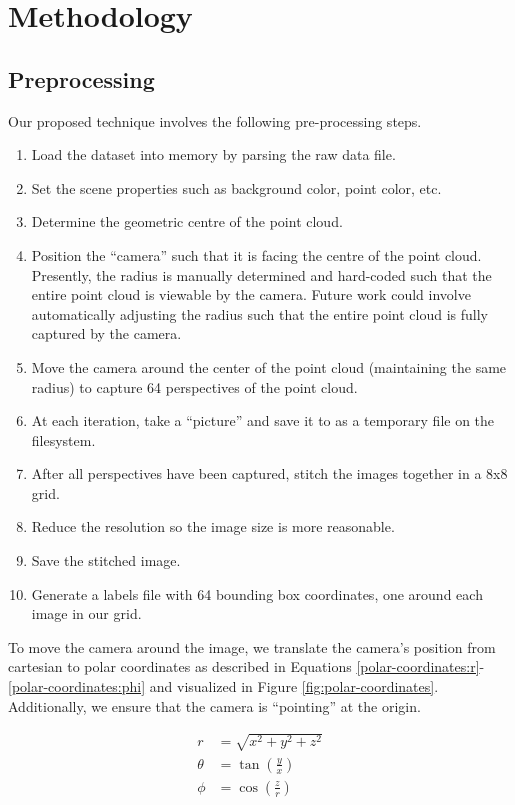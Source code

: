 \documentclass[runningheads,a4paper]{llncs}
\begin{document}
\section{Methodology}
\subsection{Preprocessing}
Our proposed technique involves the following pre-processing steps.
\begin{enumerate}
  \item Load the dataset into memory by parsing the raw data file.
  \item Set the scene properties such as background color, point color, etc.
  \item Determine the geometric centre of the point cloud.
  \item Position the “camera” such that it is facing the centre of the point
    cloud. Presently, the radius is manually determined and hard-coded such that
    the entire point cloud is viewable by the camera. Future work could involve
    automatically adjusting the radius such that the entire point cloud is fully
    captured by the camera.
  \item Move the camera around the center of the point cloud (maintaining the
    same radius) to capture 64 perspectives of the point cloud.
  \item At each iteration, take a “picture” and save it to as a temporary file
    on the filesystem.
  \item After all perspectives have been captured, stitch the images together in
    a 8x8 grid.
  \item Reduce the resolution so the image size is more reasonable.
  \item Save the stitched image.
  \item Generate a labels file with 64 bounding box coordinates, one around each
    image in our grid.
\end{enumerate}

To move the camera around the image, we translate the camera’s position from
cartesian to polar coordinates as described in Equations
\ref{polar-coordinates:r}-\ref{polar-coordinates:phi} and visualized in Figure
\ref{fig:polar-coordinates}.
Additionally, we ensure that the camera is “pointing” at the origin.

\begin{align}
  \label{polar-coordinates:r}
  r &= \sqrt{x^2 + y^2 + z^2} \\
  \label{polar-coordinates:theta}
  \theta &= \tan\left(\frac{y}{x}\right) \\
  \label{polar-coordinates:phi}
  \phi &= \cos\left(\frac{z}{r}\right)
\end{align}
\end{document}
